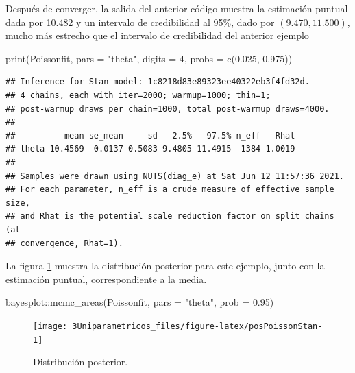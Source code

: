 \documentclass[
  10pt,
  spanish,
]{book}
\newenvironment{Shaded}{\begin{snugshade}}{\end{snugshade}}
\newcommand{\AttributeTok}[1]{\textcolor[rgb]{0.77,0.63,0.00}{#1}}
\newcommand{\DecValTok}[1]{\textcolor[rgb]{0.00,0.00,0.81}{#1}}
\newcommand{\FloatTok}[1]{\textcolor[rgb]{0.00,0.00,0.81}{#1}}
\newcommand{\FunctionTok}[1]{\textcolor[rgb]{0.00,0.00,0.00}{#1}}
\newcommand{\NormalTok}[1]{#1}
\newcommand{\SpecialCharTok}[1]{\textcolor[rgb]{0.00,0.00,0.00}{#1}}
\newcommand{\StringTok}[1]{\textcolor[rgb]{0.31,0.60,0.02}{#1}}
\theoremstyle{definition}
\theoremstyle{definition}
\theoremstyle{definition}
\theoremstyle{definition}
\theoremstyle{remark}
\begin{document}
Después de converger, la salida del anterior código muestra la estimación puntual dada por 10.482 y un intervalo de credibilidad al 95\%, dado por \((9.470, 11.500)\), mucho más estrecho que el intervalo de credibilidad del anterior ejemplo

\begin{Shaded}
\begin{Highlighting}[]
\FunctionTok{print}\NormalTok{(Poissonfit, }\AttributeTok{pars =} \StringTok{"theta"}\NormalTok{, }
      \AttributeTok{digits =} \DecValTok{4}\NormalTok{, }\AttributeTok{probs =} \FunctionTok{c}\NormalTok{(}\FloatTok{0.025}\NormalTok{, }\FloatTok{0.975}\NormalTok{))}
\end{Highlighting}
\end{Shaded}

\begin{verbatim}
## Inference for Stan model: 1c8218d83e89323ee40322eb3f4fd32d.
## 4 chains, each with iter=2000; warmup=1000; thin=1; 
## post-warmup draws per chain=1000, total post-warmup draws=4000.
## 
##          mean se_mean     sd   2.5%   97.5% n_eff   Rhat
## theta 10.4569  0.0137 0.5083 9.4805 11.4915  1384 1.0019
## 
## Samples were drawn using NUTS(diag_e) at Sat Jun 12 11:57:36 2021.
## For each parameter, n_eff is a crude measure of effective sample size,
## and Rhat is the potential scale reduction factor on split chains (at 
## convergence, Rhat=1).
\end{verbatim}

La figura \ref{fig:posPoissonStan} muestra la distribución posterior para este ejemplo, junto con la estimación puntual, correspondiente a la media.

\begin{Shaded}
\begin{Highlighting}[]
\NormalTok{bayesplot}\SpecialCharTok{::}\FunctionTok{mcmc\_areas}\NormalTok{(Poissonfit, }\AttributeTok{pars =} \StringTok{"theta"}\NormalTok{, }
                      \AttributeTok{prob =} \FloatTok{0.95}\NormalTok{)}
\end{Highlighting}
\end{Shaded}

\begin{figure}

{\centering \texttt{[image: 3Uniparametricos\_files/figure-latex/posPoissonStan-1]} 

}

\caption{Distribución posterior.}\label{fig:posPoissonStan}
\end{figure}
\end{document}
